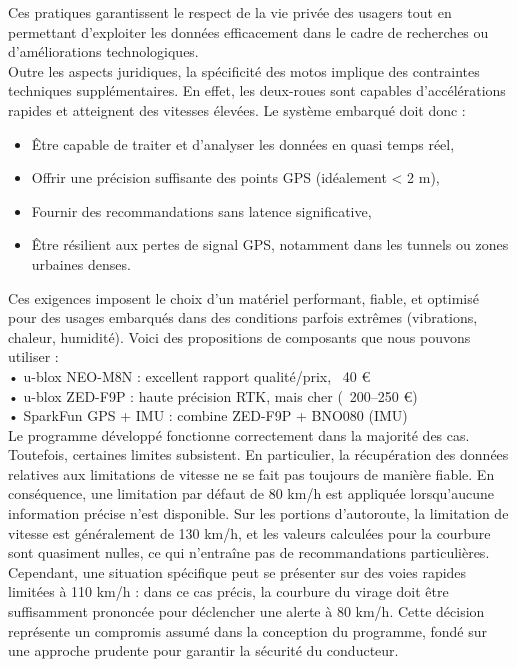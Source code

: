 Ces pratiques garantissent le respect de la vie privée des usagers tout en permettant d’exploiter les données efficacement dans le cadre de recherches ou d’améliorations technologiques.\\

\vspace{0.5cm}
Outre les aspects juridiques, la spécificité des motos implique des contraintes techniques supplémentaires. En effet, les deux-roues sont capables d’accélérations rapides et atteignent des vitesses élevées. Le système embarqué doit donc :
\begin{itemize}
  \item Être capable de traiter et d’analyser les données en quasi temps réel,
  \item Offrir une précision suffisante des points GPS (idéalement < 2 m),
  \item Fournir des recommandations sans latence significative,
  \item Être résilient aux pertes de signal GPS, notamment dans les tunnels ou zones urbaines denses.
\end{itemize}
Ces exigences imposent le choix d’un matériel performant, fiable, et optimisé pour des usages embarqués dans des conditions parfois extrêmes (vibrations, chaleur, humidité).
\vspace{0.5cm}
Voici des propositions de composants que nous pouvons utiliser : 	\\
•	u-blox NEO-M8N : excellent rapport qualité/prix, ~40 € \\
•	u-blox ZED-F9P : haute précision RTK, mais cher (~200–250 €) \\
•	SparkFun GPS + IMU : combine ZED-F9P + BNO080 (IMU)\\
\vspace{0.5cm}
Le programme développé fonctionne correctement dans la majorité des cas. Toutefois, certaines limites subsistent. En particulier, la récupération des données relatives aux limitations de vitesse ne se fait pas toujours de manière fiable. En conséquence, une limitation par défaut de 80 km/h est appliquée lorsqu’aucune information précise n’est disponible. Sur les portions d’autoroute, la limitation de vitesse est généralement de 130 km/h, et les valeurs calculées pour la courbure sont quasiment nulles, ce qui n’entraîne pas de recommandations particulières.
Cependant, une situation spécifique peut se présenter sur des voies rapides limitées à 110 km/h : dans ce cas précis, la courbure du virage doit être suffisamment prononcée pour déclencher une alerte à 80 km/h. Cette décision représente un compromis assumé dans la conception du programme, fondé sur une approche prudente pour garantir la sécurité du conducteur.

